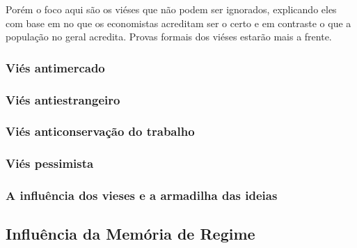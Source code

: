 Porém o foco aqui são os viéses que não podem ser ignorados, explicando eles com base em no que os economistas acreditam ser o certo e em contraste o que a população no geral acredita. Provas formais dos viéses estarão mais a frente.


\subsubsection{Viés antimercado}




\subsubsection{Viés antiestrangeiro}


\subsubsection{Viés anticonservação do trabalho}


\subsubsection{Viés pessimista}


\subsubsection{A influência dos vieses e a armadilha das ideias}


\subsection{Influência da Memória de Regime}

